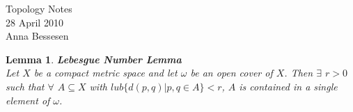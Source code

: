 \documentclass[11pt,reqno]{amsart}
\newtheorem{Lemma}{Lemma}
\theoremstyle{definition}
\begin{document}
    \begin{center}
    \LARGE{Topology Notes} \\
    \vspace{.1in}
    \normalsize{28 April 2010}\\
    \vspace{.1in}
    \normalsize{Anna Bessesen} \\
    \vspace{.2in}
    \end{center}
    \begin{Lemma}
    \textbf{Lebesgue Number Lemma}\\
    Let $X$ be a compact metric space and let $\omega$ be an open cover of $X$. Then $\exists$ $r > 0$ such that $\forall$ $A \subseteq X$ with $lub \{ d(p,q)|p, q \in A \} < r$, $A$ is contained in a single element of $\omega$.
    \end{Lemma}
    
\end{document}
